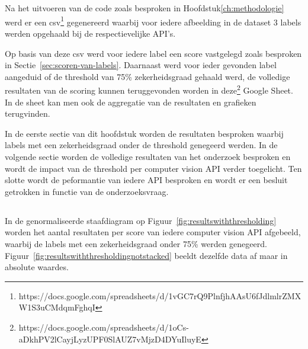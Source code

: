 
\chapter{}
\label{ch:resultaten}

\section{}
\label{sec:resultaten-inleiding}
Na het uitvoeren van de code zoals besproken in Hoofdstuk\ref{ch:methodologie} werd er een csv\footnote{https://docs.google.com/spreadsheets/d/1vGC7rQ9PlnfjhAAsU6fJdlmlrZMXW1S3uCMdqmFghqI} gegenereerd waarbij voor iedere afbeelding in de dataset 3 labels werden opgehaald bij de respectievelijke API's.

Op basis van deze csv werd voor iedere label een score vastgelegd zoals besproken in Sectie~\ref{sec:scoren-van-labels}. Daarnaast werd voor ieder gevonden label aangeduid of de threshold van 75\% zekerheidsgraad gehaald werd, de volledige resultaten van de scoring kunnen teruggevonden worden in deze\footnote{https://docs.google.com/spreadsheets/d/1oCs-aDkhPV2lCayjLyzUPF0SlAUZ7vMjzD4DYuIluyE} Google Sheet. In de sheet kan men ook de aggregatie van de resultaten en grafieken terugvinden.

In de eerste sectie van dit hoofdstuk worden de resultaten besproken waarbij labels met een zekerheidsgraad onder de threshold genegeerd werden. In de volgende sectie worden de volledige resultaten van het onderzoek besproken en wordt de impact van de threshold per computer vision API verder toegelicht. Ten slotte wordt de peformantie van iedere API besproken en wordt er een besluit getrokken in functie van de onderzoeksvraag.

\section{}
\label{sec:resultaten-met-thresholding}
In de genormaliseerde staafdiagram op Figuur~\ref{fig:resultswiththresholding} worden het aantal resultaten per score van iedere computer vision API afgebeeld, waarbij de labels met een zekerheidsgraad onder 75\% werden genegeerd. Figuur~\ref{fig:resultswiththresholdingnotstacked} beeldt dezelfde data af maar in absolute waardes.

